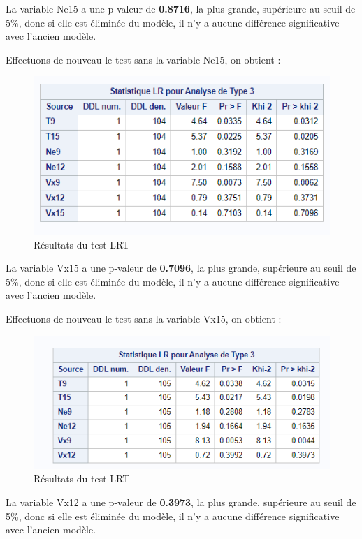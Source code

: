 \documentclass[12pt,a4paper]{article}
\begin{document}
La variable Ne15 a une p-valeur de \textbf{0.8716}, la plus grande, supérieure au seuil de 5\%, donc si elle est éliminée du modèle, il n'y a aucune différence significative avec l'ancien modèle.

Effectuons de nouveau le test sans la variable Ne15, on obtient :

\begin{figure}[H]
	\centering
	\includegraphics[width=\textwidth]{LRT_2.PNG}
	\caption{Résultats du test LRT}
	\label{fig:resultats_lrt2}
\end{figure}

La variable Vx15 a une p-valeur de \textbf{0.7096}, la plus grande, supérieure au seuil de 5\%, donc si elle est éliminée du modèle, il n'y a aucune différence significative avec l'ancien modèle.

Effectuons de nouveau le test sans la variable Vx15, on obtient :

\begin{figure}[H]
	\centering
	\includegraphics[width=\textwidth]{LRT_3.PNG}
	\caption{Résultats du test LRT}
	\label{fig:resultats_lrt3}
\end{figure}

La variable Vx12 a une p-valeur de \textbf{0.3973}, la plus grande, supérieure au seuil de 5\%, donc si elle est éliminée du modèle, il n'y a aucune différence significative avec l'ancien modèle.
\end{document}
